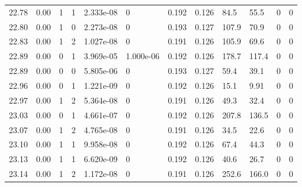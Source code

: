 \documentclass[preview]{standalone}
\begin{document}
{{{{{{{{{{{{{{{{{{\begin{tabular}{L{1.2cm}C{1.2cm} C{0.3cm}C{0.5cm} C{1.4cm}C{1.4cm} C{1.4cm}C{1.4cm} C{1.6cm}C{1.6cm} C{1.6cm}C{1.6cm}}
  22.78  &  0.00  & 1     &  1 &  2.333e-08  & 0  &  0.192&   0.126& 84.5 & 55.5   &  0 & 0  \\ 
  22.80  &  0.00  & 1     &  0 &  2.273e-08  & 0  &  0.193&   0.127& 107.9 & 70.9   &  0 & 0  \\ 
  22.83  &  0.00  & 1     &  2 &  1.027e-08  & 0  &  0.191&   0.126& 105.9 & 69.6   &  0 & 0  \\ 
  22.89  &  0.00  & 0     &  1 &  3.969e-05  & 1.000e-06  &  0.192&   0.126& 178.7 & 117.4   &  0 & 0  \\ 
  22.89  &  0.00  & 0     &  0 &  5.805e-06  & 0  &  0.193&   0.127& 59.4 & 39.1   &  0 & 0  \\ 
  22.96  &  0.00  & 0     &  1 &  1.221e-09  & 0  &  0.192&   0.126& 15.1 & 9.91   &  0 & 0  \\ 
  22.97  &  0.00  & 1     &  2 &  5.364e-08  & 0  &  0.191&   0.126& 49.3 & 32.4   &  0 & 0  \\ 
  23.03  &  0.00  & 0     &  1 &  4.661e-07  & 0  &  0.192&   0.126& 207.8 & 136.5   &  0 & 0  \\ 
  23.07  &  0.00  & 1     &  2 &  4.765e-08  & 0  &  0.191&   0.126& 34.5 & 22.6   &  0 & 0  \\ 
  23.10  &  0.00  & 1     &  1 &  9.958e-08  & 0  &  0.192&   0.126& 67.4 & 44.3   &  0 & 0  \\ 
  23.13  &  0.00  & 1     &  1 &  6.620e-09  & 0  &  0.192&   0.126& 40.6 & 26.7   &  0 & 0  \\ 
  23.14  &  0.00  & 1     &  2 &  1.172e-08  & 0  &  0.191&   0.126& 252.6 & 166.0   &  0 & 0  \\ 
\hline 
\end{tabular} 

}}}}}}}}}}}}}}}}}}
\end{document}
